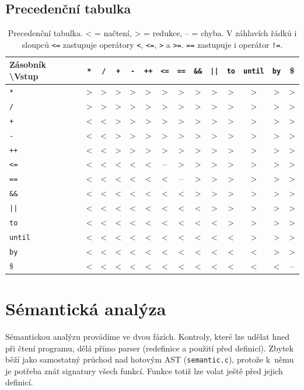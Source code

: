 \documentclass[a4paper,11pt]{article}
\begin{document}
\subsection{Precedenční tabulka}
\label{sec:prec}
\begin{table}[H]
  \centering
  \setlength{\tabcolsep}{4pt}
  \begin{tabular}{l|*{13}{c}}
    \toprule
    Zásobník \textbackslash Vstup & \texttt{*} & \texttt{/} & \texttt{+} & \texttt{-} & \texttt{++} & \texttt{<=} & \texttt{==}
    & \texttt{\&\&} & \texttt{||} & \texttt{to} & \texttt{until} & \texttt{by} & \$ \\
    \midrule
    \texttt{*}     & > & > & > & > & > & > & > & > & > & > & > & > & > \\
    \texttt{/}     & > & > & > & > & > & > & > & > & > & > & > & > & > \\
    \texttt{+}     & < & < & > & > & > & > & > & > & > & > & > & > & > \\
    \texttt{-}     & < & < & > & > & > & > & > & > & > & > & > & > & > \\
    \texttt{++}    & < & < & > & > & > & > & > & > & > & > & > & > & > \\
    \texttt{<=}    & < & < & < & < & < & -- & > & > & > & > & > & > & > \\
    \texttt{==}    & < & < & < & < & < & < & -- & > & > & > & > & > & > \\
    \texttt{\&\&}  & < & < & < & < & < & < & < & > & > & > & > & > & > \\
    \texttt{||}    & < & < & < & < & < & < & < & < & > & > & > & > & > \\
    \texttt{to}    & < & < & < & < & < & < & < & < & < & > & > & > & > \\
    \texttt{until} & < & < & < & < & < & < & < & < & < & < & > & > & > \\
    \texttt{by}    & < & < & < & < & < & < & < & < & < & < & < & > & > \\
    \$             & < & < & < & < & < & < & < & < & < & < & < & < & -- \\
    \bottomrule
  \end{tabular}
  \caption{Precedenční tabulka.
           < = načtení, > = redukce,
           -- = chyba. V záhlavích řádků i sloupců \texttt{<=} zastupuje operátory \texttt{<}, \texttt{<=}, \texttt{>} a \texttt{>=}. \texttt{==} zastupuje i operátor \texttt{!=}.}
  \label{tab:prec}
\end{table}

\section{Sémantická analýza}
\label{sec:semantika}
Sémantickou analýzu provádíme ve dvou fázích. Kontroly, které lze udělat
hned při čtení programu, dělá přímo parser (redefinice a použití před definicí). Zbytek běží jako samostatný
průchod nad hotovým AST (\texttt{semantic.c}), protože k~němu je potřeba
znát signatury všech funkcí. Funkce totiž lze volat ještě před jejich
definicí.
\end{document}
